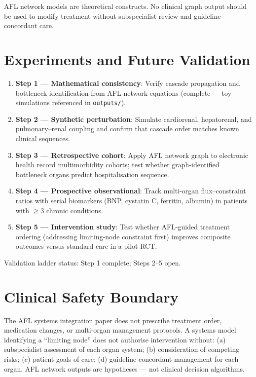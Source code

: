 \documentclass[11pt]{article}
\begin{document}
AFL network models are theoretical constructs. No clinical graph output should be used to modify treatment without subspecialist review and guideline-concordant care.

\section{Experiments and Future Validation}

\begin{enumerate}
  \item \textbf{Step 1 --- Mathematical consistency}: Verify cascade propagation and bottleneck identification from AFL network equations (complete --- toy simulations referenced in \texttt{outputs/}).
  \item \textbf{Step 2 --- Synthetic perturbation}: Simulate cardiorenal, hepatorenal, and pulmonary--renal coupling and confirm that cascade order matches known clinical sequences.
  \item \textbf{Step 3 --- Retrospective cohort}: Apply AFL network graph to electronic health record multimorbidity cohorts; test whether graph-identified bottleneck organs predict hospitalisation sequence.
  \item \textbf{Step 4 --- Prospective observational}: Track multi-organ flux--constraint ratios with serial biomarkers (BNP, cystatin C, ferritin, albumin) in patients with $\geq 3$ chronic conditions.
  \item \textbf{Step 5 --- Intervention study}: Test whether AFL-guided treatment ordering (addressing limiting-node constraint first) improves composite outcomes versus standard care in a pilot RCT.
\end{enumerate}

Validation ladder status: Step 1 complete; Steps 2--5 open.

\section{Clinical Safety Boundary}

The AFL systems integration paper does not prescribe treatment order, medication changes, or multi-organ management protocols. A systems model identifying a ``limiting node'' does not authorise intervention without: (a) subspecialist assessment of each organ system; (b) consideration of competing risks; (c) patient goals of care; (d) guideline-concordant management for each organ. AFL network outputs are hypotheses --- not clinical decision algorithms.
\end{document}
